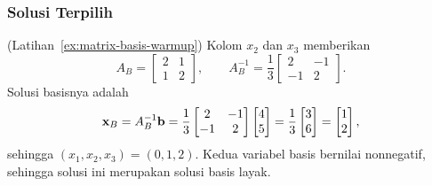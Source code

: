 \subsubsection*{Solusi Terpilih}

\begin{solution}(Latihan~\ref{ex:matrix-basis-warmup})
Kolom \( x_2 \) dan \( x_3 \) memberikan
\[
A_B =
\begin{bmatrix}
    2 & 1 \\
    1 & 2
\end{bmatrix},
\qquad
A_B^{-1} = \frac{1}{3}
\begin{bmatrix}
    2 & -1 \\
    -1 & 2
\end{bmatrix}.
\]
Solusi basisnya adalah
\[
\mathbf{x}_B = A_B^{-1}\mathbf{b} = \frac{1}{3}
\begin{bmatrix}
    2 & -1 \\
    -1 & 2
\end{bmatrix}
\begin{bmatrix}
    4 \\ 5
\end{bmatrix}
= \frac{1}{3}
\begin{bmatrix}
    3 \\ 6
\end{bmatrix}
=
\begin{bmatrix}
    1 \\ 2
\end{bmatrix},
\]
sehingga \( (x_1, x_2, x_3) = (0, 1, 2) \).  Kedua variabel basis bernilai nonnegatif, sehingga solusi ini merupakan solusi basis layak.
\end{solution}

